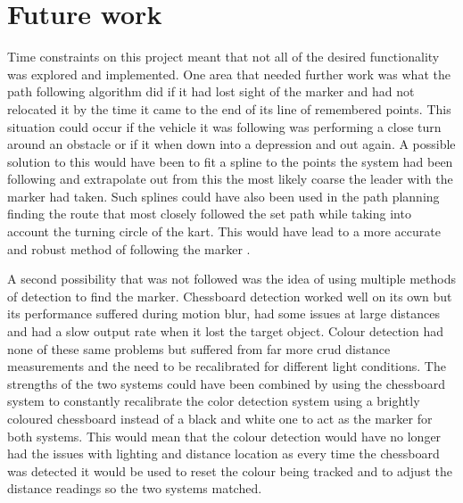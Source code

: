 \section{Future work}
Time constraints on this project meant that not all of the desired functionality was explored and implemented. One area that needed further work was what the path following algorithm did if it had lost sight of the marker and had not relocated it by the time it came to the end of its line of remembered points. This situation could occur if the vehicle it was following was performing a close turn around an obstacle or if it when down into a depression and out again. A possible solution to this would have been to fit a spline to the points the system had been following and extrapolate out from this the most likely coarse the leader with the marker had taken. Such splines could have also been used in the path planning finding the route that most closely followed the set path while taking into account the turning circle of the kart. This would have lead to a more accurate and robust method of following the marker \cite{path}. 

A second possibility that was not followed was the idea of using multiple methods of detection to find the marker. Chessboard detection worked well on its own but its performance suffered during motion blur, had some issues at large distances and had a slow output rate when it lost the target object. Colour detection had none of these same problems but suffered from far more crud distance measurements and the need to be recalibrated for different light conditions. The strengths of the two systems could have been combined by using the chessboard system to constantly recalibrate the color detection system using a brightly coloured chessboard instead of a black and white one to act as the marker for both systems. This would mean that the colour detection would have no longer had the issues with lighting and distance location as every time the chessboard was detected it would be used to reset the colour being tracked and to adjust the distance readings so the two systems matched.